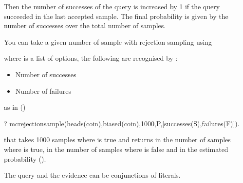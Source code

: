 \documentclass[letterpaper,10pt,english]{sphinxmanual}
\begin{document}
Then the number of successes of the query is increased by 1 if the query succeeded in the last accepted sample.
The final probability is given by the number of successes over the total number of samples.

You can take a given number of sample with rejection sampling using

\begin{sphinxVerbatim}[commandchars=\\\{\}]
  
\end{sphinxVerbatim}

where  is a list of options, the following are recognised by :
\begin{itemize}
\item {} 
 Number of successes

\item {} 
 Number of failures

\end{itemize}

as in ()

\begin{sphinxVerbatim}[commandchars=\\\{\}]
?\PYGZhy{} mc\PYGZus{}rejection\PYGZus{}sample(heads(coin),biased(coin),1000,P,[successes(S),failures(F)]).
\end{sphinxVerbatim}

that takes 1000 samples where  is true and returns in  the number of samples where  is true, in  the number of samples where  is false and in  the estimated probability ().

The query and the evidence can be conjunctions of literals.
\end{document}
